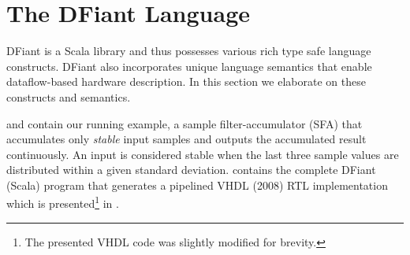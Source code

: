 \section{The DFiant Language}
\label{sec:dfiant}
DFiant is a Scala library and thus possesses various rich type safe language constructs. DFiant also incorporates unique language semantics that enable dataflow-based hardware description. In this section we elaborate on these constructs and semantics. 

 and  contain our running example, a sample filter-accumulator (SFA) that accumulates only \textit{stable} input samples and outputs the accumulated result continuously. An input is considered stable when the last three sample values are distributed within a given standard deviation.  contains the complete DFiant (Scala) program that generates a pipelined VHDL (2008) RTL implementation which is presented\footnote{The presented VHDL code was slightly modified for brevity.} in .


